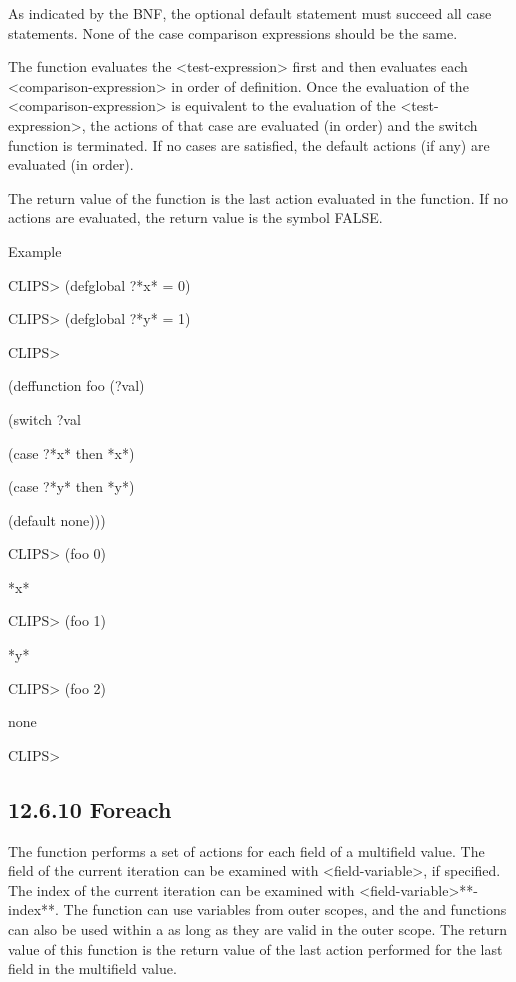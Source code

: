 \documentclass[letterpaper,10pt,english]{sphinxmanual}
\begin{document}
As indicated by the BNF, the optional default statement must succeed all
case statements. None of the case comparison expressions should be the
same.

The  function evaluates the \textless{}test-expression\textgreater{} first and then
evaluates each \textless{}comparison-expression\textgreater{} in order of definition. Once the
evaluation of the \textless{}comparison-expression\textgreater{} is equivalent to the
evaluation of the \textless{}test-expression\textgreater{}, the actions of that case are
evaluated (in order) and the switch function is terminated. If no cases
are satisfied, the default actions (if any) are evaluated (in order).

The return value of the  function is the last action evaluated
in the  function. If no actions are evaluated, the return
value is the symbol FALSE.

Example

CLIPS\textgreater{} (defglobal ?*x* = 0)

CLIPS\textgreater{} (defglobal ?*y* = 1)

CLIPS\textgreater{}

(deffunction foo (?val)

(switch ?val

(case ?*x* then *x*)

(case ?*y* then *y*)

(default none)))

CLIPS\textgreater{} (foo 0)

*x*

CLIPS\textgreater{} (foo 1)

*y*

CLIPS\textgreater{} (foo 2)

none

CLIPS\textgreater{}


\subsection{12.6.10 Foreach}
\label{\detokenize{actions:foreach}}
The  function performs a set of actions for each field of a
multifield value. The field of the current iteration can be examined
with \textless{}field-variable\textgreater{}, if specified. The index of the current iteration
can be examined with \textless{}field-variable\textgreater{}**-index**. The 
function can use variables from outer scopes, and the  and
 functions can also be used within a  as long as
they are valid in the outer scope. The return value of this function is
the return value of the last action performed for the last field in the
multifield value.
\end{document}
